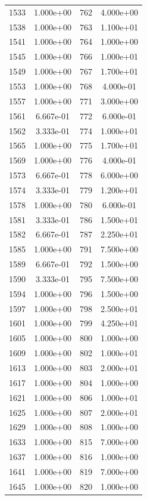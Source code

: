 \documentclass[12pt]{article}
\begin{document}
\begin{longtable}{@{}cccc@{}}
1533 & 1.000e+00 & 762 & 4.000e+00 \\
1538 & 1.000e+00 & 763 & 1.100e+01 \\
1541 & 1.000e+00 & 764 & 1.000e+00 \\
1545 & 1.000e+00 & 766 & 1.000e+01 \\
1549 & 1.000e+00 & 767 & 1.700e+01 \\
1553 & 1.000e+00 & 768 & 4.000e-01 \\
1557 & 1.000e+00 & 771 & 3.000e+00 \\
1561 & 6.667e-01 & 772 & 6.000e-01 \\
1562 & 3.333e-01 & 774 & 1.000e+01 \\
1565 & 1.000e+00 & 775 & 1.700e+01 \\
1569 & 1.000e+00 & 776 & 4.000e-01 \\
1573 & 6.667e-01 & 778 & 6.000e+00 \\
1574 & 3.333e-01 & 779 & 1.200e+01 \\
1578 & 1.000e+00 & 780 & 6.000e-01 \\
1581 & 3.333e-01 & 786 & 1.500e+01 \\
1582 & 6.667e-01 & 787 & 2.250e+01 \\
1585 & 1.000e+00 & 791 & 7.500e+00 \\
1589 & 6.667e-01 & 792 & 1.500e+00 \\
1590 & 3.333e-01 & 795 & 7.500e+00 \\
1594 & 1.000e+00 & 796 & 1.500e+00 \\
1597 & 1.000e+00 & 798 & 2.500e+01 \\
1601 & 1.000e+00 & 799 & 4.250e+01 \\
1605 & 1.000e+00 & 800 & 1.000e+00 \\
1609 & 1.000e+00 & 802 & 1.000e+01 \\
1613 & 1.000e+00 & 803 & 2.000e+01 \\
1617 & 1.000e+00 & 804 & 1.000e+00 \\
1621 & 1.000e+00 & 806 & 1.000e+01 \\
1625 & 1.000e+00 & 807 & 2.000e+01 \\
1629 & 1.000e+00 & 808 & 1.000e+00 \\
1633 & 1.000e+00 & 815 & 7.000e+00 \\
1637 & 1.000e+00 & 816 & 1.000e+00 \\
1641 & 1.000e+00 & 819 & 7.000e+00 \\
1645 & 1.000e+00 & 820 & 1.000e+00 \\

\bottomrule
\end{longtable}
\end{document}
